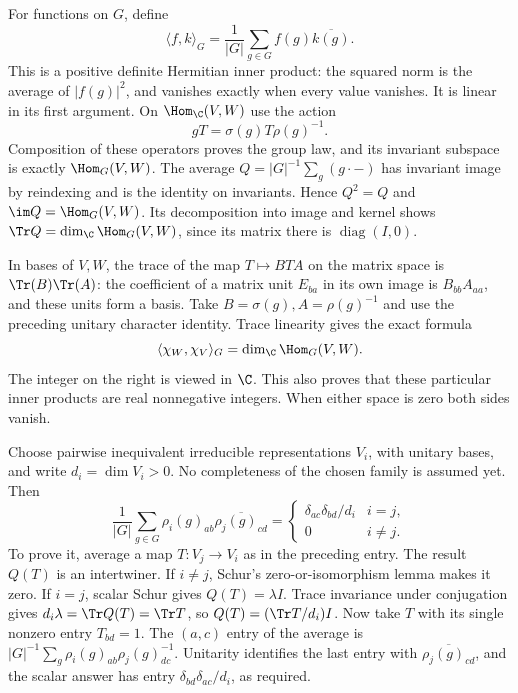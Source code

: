 For functions on $G$, define
\[
 \langle f,k\rangle_G=\frac1{|G|}\sum_{g\in G}
 f(g)\overline{k(g)}.
\]
This is a positive definite Hermitian inner product: the squared norm is
the average of $|f(g)|^2$, and vanishes exactly when every value vanishes.
It is linear in its first argument. On $\Hom_\C(V,W)$ use the action
\[
 gT=\sigma(g)T\rho(g)^{-1}.
\]
Composition of these operators proves the group law, and its invariant
subspace is exactly $\Hom_G(V,W)$.
The average $Q=|G|^{-1}\sum_g(g\cdot-)$ has invariant image by
reindexing and is the identity on invariants. Hence $Q^2=Q$ and
$\im Q=\Hom_G(V,W)$. Its decomposition into image and kernel
shows $\Tr Q=\dim_\C\Hom_G(V,W)$, since its matrix there is
$\operatorname{diag}(I,0)$.

In bases of $V,W$, the trace of the map $T\mapsto BT A$ on the
matrix space is $\Tr(B)\Tr(A)$: the coefficient of a matrix unit
$E_{ba}$ in its own image is $B_{bb}A_{aa}$, and these units form
a basis. Take $B=\sigma(g),A=\rho(g)^{-1}$ and use the preceding
unitary character identity. Trace linearity gives the exact formula
\begin{equation}\label{eq:character-hom-pairing}
 \langle\chi_W,\chi_V\rangle_G
   =\dim_\C\Hom_G(V,W).
\end{equation}
The integer on the right is viewed in $\C$. This also proves that these
particular inner products are real nonnegative integers. When either
space is zero both sides vanish.

Choose pairwise inequivalent irreducible representations $V_i$, with
unitary bases, and write $d_i=\dim V_i>0$. No completeness of the
chosen family is assumed yet. Then
\begin{equation}\label{eq:matrix-orthogonality}
 \frac1{|G|}\sum_{g\in G}\rho_i(g)_{ab}
      \overline{\rho_j(g)_{cd}}
 =\begin{cases}\delta_{ac}\delta_{bd}/d_i&i=j,\\0&i\ne j.
 \end{cases}
\end{equation}
To prove it, average a map $T:V_j\to V_i$ as in the preceding entry.
The result $Q(T)$ is an intertwiner. If $i\ne j$, Schur's
zero-or-isomorphism lemma makes it zero. If $i=j$, scalar Schur gives
$Q(T)=\lambda I$. Trace invariance under conjugation gives
$d_i\lambda=\Tr Q(T)=\Tr T$, so $Q(T)=(\Tr T/d_i)I$.
Now take $T$ with its single nonzero entry $T_{bd}=1$. The $(a,c)$
entry of the average is
$|G|^{-1}\sum_g\rho_i(g)_{ab}\rho_j(g)^{-1}_{dc}$.
Unitarity identifies the last entry with
$\overline{\rho_j(g)_{cd}}$, and the scalar answer has entry
$\delta_{bd}\delta_{ac}/d_i$, as required.

